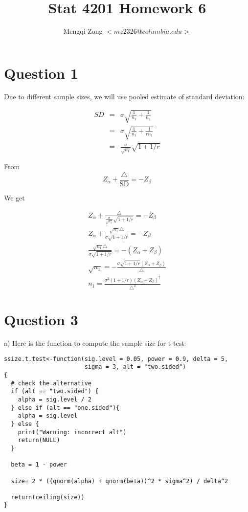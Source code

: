 \documentclass[12pt]{article}
\title{Stat 4201 Homework 6}
\author{Mengqi Zong $<mz2326@columbia.edu>$}
\begin{document}
\maketitle

\setlength{\parindent}{0in}

\section*{Question 1}

Due to different sample sizes, we will use pooled estimate of standard
deviation:

\begin{eqnarray*}
SD
&=& \sigma \sqrt {\frac {1}{n_1} + \frac{1}{n_2}} \\
&=& \sigma \sqrt {\frac {1}{n_1} + \frac{1}{rn_1}} \\
&=& \frac {\sigma}{\sqrt {n_1}} \sqrt {1 + 1 / r} 
\end{eqnarray*}

From
\begin{equation*}
Z_{\alpha} + \frac {\triangle}{\text {SD}} = - Z_{\beta}
\end{equation*}

We get

\begin{eqnarray*}
Z_{\alpha} + \frac {\triangle}{\frac {\sigma}{\sqrt {n_1}} \sqrt {1 +
    1 / r}} = - Z_{\beta} \\
Z_{\alpha} + \frac {\sqrt {n_1} \triangle}{\sigma \sqrt {1 +
    1 / r}} = - Z_{\beta} \\
\frac {\sqrt {n_1} \triangle}{\sigma \sqrt {1 + 1 / r}} = -
(Z_{\alpha} + Z_{\beta}) \\
\sqrt {n_1} = - \frac {\sigma \sqrt {1 + 1 / r}(Z_{\alpha} +
  Z_{\beta})}{\triangle} \\
n_1= \frac {\sigma^2 (1 + 1 / r) (Z_{\alpha} +
  Z_{\beta})^2}{\triangle^2}
\end{eqnarray*}

\section*{Question 3}

a) Here is the function to compute the sample size for t-test:

\begin{verbatim}
ssize.t.test<-function(sig.level = 0.05, power = 0.9, delta = 5,
                       sigma = 3, alt = "two.sided") 
{
  # check the alternative
  if (alt == "two.sided") {
    alpha = sig.level / 2 
  } else if (alt == "one.sided"){
    alpha = sig.level
  } else {
    print("Warning: incorrect alt")
    return(NULL)
  }

  beta = 1 - power
  
  size= 2 * ((qnorm(alpha) + qnorm(beta))^2 * sigma^2) / delta^2

  return(ceiling(size))  
}
\end{verbatim}
\end{document}
